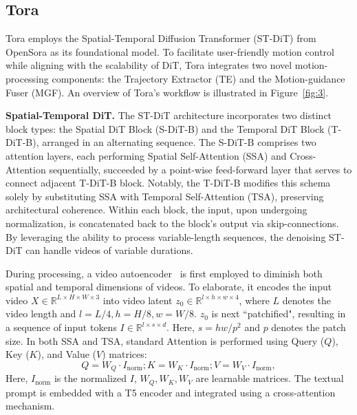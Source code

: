 \subsection{Tora}
Tora employs the Spatial-Temporal Diffusion Transformer (ST-DiT) from OpenSora as its foundational model. To facilitate user-friendly motion control while aligning with the scalability of DiT, Tora integrates two novel motion-processing components: the Trajectory Extractor (TE) and the Motion-guidance Fuser (MGF). An overview of Tora's workflow is illustrated in Figure~\ref{fig:3}.

\noindent \textbf{Spatial-Temporal DiT.} The ST-DiT architecture incorporates two distinct block types: the Spatial DiT Block (S-DiT-B) and the Temporal DiT Block (T-DiT-B), arranged in an alternating sequence. The S-DiT-B comprises two attention layers, each performing Spatial Self-Attention (SSA) and Cross-Attention sequentially, succeeded by a point-wise feed-forward layer that serves to connect adjacent T-DiT-B block. Notably, the T-DiT-B modifies this schema solely by substituting SSA with Temporal Self-Attention (TSA), preserving architectural coherence. Within each block, the input, upon undergoing normalization, is concatenated back to the block's output via skip-connections. By leveraging the ability to process variable-length sequences, the denoising ST-DiT can handle videos of variable durations.

During processing, a video autoencoder~\cite{yu2023magvit} is first employed to diminish both spatial and temporal dimensions of videos. To elaborate, it encodes the input video $X \in \mathbb{R}^{L \times H \times W \times 3}$ into video latent $z_{0} \in \mathbb{R}^{l \times h \times w \times 4}$, where $L$ denotes the video length and $l = L / 4, h = H / 8, w = W / 8$.  $z_{0}$ is next ``patchified", resulting in a sequence of input tokens $I \in \mathbb{R}^{l \times s \times d} $. Here, $s = hw/p^2$ and $p$ denotes the patch size. 
In both SSA and TSA, standard Attention is performed using Query ($Q$), Key ($K$), and Value ($V$) matrices:
\vspace{-2mm}
\begin{equation}
Q = W_{Q} \cdot I_\mathrm{norm}; K = W_{K} \cdot I_\mathrm{norm}; V = W_{V} \cdot I_\mathrm{norm},
\end{equation}
Here, $I_\mathrm{norm}$ is the normalized $I$, $W_{Q},W_{K}, W_{V}$ are learnable matrices.
The textual prompt is embedded with a T5 encoder and integrated using a cross-attention mechanism.

